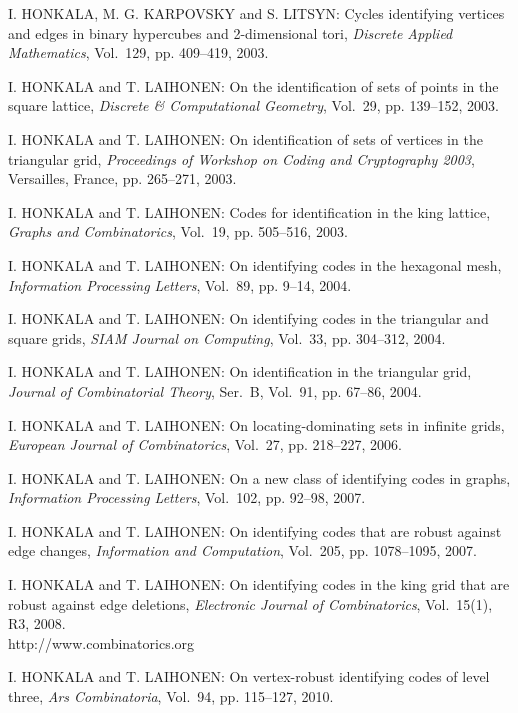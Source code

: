 \begin{thebibliography}{999}
I. HONKALA, M. G. KARPOVSKY and S. LITSYN: Cycles identifying vertices and edges in binary hypercubes and 2-dimensional tori, {\it Discrete Applied Mathematics}, Vol.~129, pp. 409--419, 2003.

I. HONKALA and T. LAIHONEN: On the identification of sets of points in the square lattice, {\it Discrete \& Computational Geometry}, Vol.~29, pp. 139--152, 2003.

I. HONKALA and T. LAIHONEN: On identification of sets of vertices in the triangular grid, {\it Proceedings of Workshop on Coding and Cryptography 2003}, Versailles, France, pp. 265--271, 2003.

I. HONKALA and T. LAIHONEN: Codes for identification in the king lattice, {\it Graphs and Combinatorics}, Vol.~19, pp. 505--516, 2003.

I. HONKALA and T. LAIHONEN: On identifying codes in the hexagonal mesh, {\it Information Processing Letters}, Vol.~89, pp. 9--14, 2004.

I. HONKALA and T. LAIHONEN: On identifying codes in the triangular and square grids, {\it SIAM Journal on Computing}, Vol.~33, pp. 304--312, 2004.

I. HONKALA and T. LAIHONEN: On identification in the triangular grid, {\it Journal of Combinatorial Theory}, Ser.~B, Vol.~91, pp. 67--86, 2004.

I. HONKALA and T. LAIHONEN: On locating-dominating sets in infinite grids, {\it European Journal of Combinatorics}, Vol.~27, pp. 218--227, 2006.

I. HONKALA and T. LAIHONEN: On a new class of identifying codes in graphs, {\it Information Processing Letters}, Vol.~102, pp. 92--98, 2007.

I. HONKALA and T. LAIHONEN: On identifying codes that are robust against edge changes, {\it Information and Computation}, Vol.~205, pp. 1078--1095, 2007.

I. HONKALA and T. LAIHONEN: On identifying codes in the king grid that are robust against edge deletions, {\it Electronic Journal of Combinatorics}, Vol.~15(1), R3, 2008.\\
http://www.combinatorics.org

I. HONKALA and T. LAIHONEN: On vertex-robust identifying codes of level three, {\it Ars Combinatoria}, Vol.~94, pp. 115--127, 2010.


\end{thebibliography}
